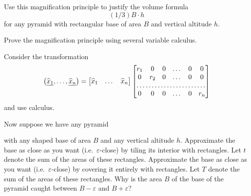 \documentclass{ximera}
\begin{document}
\begin{problem}
Use this magnification principle to justify the volume formula%
\[
(1/3)B\cdot h
\]
for any pyramid with rectangular base of area $B$ and vertical altitude $h$.
\end{problem}

\begin{problem}
Prove the magnification principle using several variable calculus.

\begin{hint}
Consider the transformation%
\[
\left(  \underline{\hat{x}_{1}},\dots,\underline{\hat{x}_{n}}\right)
=
\begin{bmatrix}
\hat{x}_{1} & \dots & \hat{x}_{n}
\end{bmatrix}  
\begin{bmatrix}
r_{1} & 0   & 0 & \dots & 0 & 0\\
0     & r_2 & 0 & \dots & 0 & 0\\
\hdotsfor{6}\\
0     & 0   & 0 & \dots & 0 & r_{n}%
\end{bmatrix}
\]
and use calculus.
\end{hint}
\end{problem}

Now suppose we have any pyramid%
\begin{image}
\end{image}
with any shaped base of area $B$ and any vertical altitude $h$. Approximate
the base as close as you want (i.e.\ $\varepsilon$-close) by tiling its interior
with rectangles. Let $t$ denote the sum of the areas of these rectangles.
Approximate the base as close as you want (i.e.\ $\varepsilon$-close) by
covering it entirely with rectangles. Let $T$ denote the sum of the areas of
these rectangles. Why is the area $B$ of the base of the pyramid caught
between $B-\varepsilon$ and $B+\varepsilon$?
\end{document}
